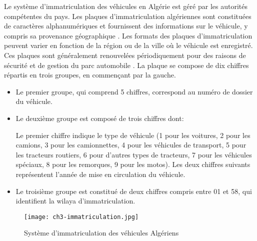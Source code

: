 Le système d'immatriculation des véhicules en Algérie est géré par les autorités compétentes du pays. 
Les plaques d'immatriculation algériennes sont constituées de caractères alphanumériques et fournissent des informations sur le véhicule, y compris sa provenance géographique \cite{wikipedia-plaque-immatriculation}. 
Les formats des plaques d'immatriculation peuvent varier en fonction de la région ou de la ville où le véhicule est enregistré. Ces plaques sont généralement renouvelées périodiquement pour des raisons de sécurité et de gestion du parc automobile \cite{akacem2015reconnaissance}.
La plaque se compose de dix chiffres répartis en trois groupes, en commençant par la gauche. 
\begin{itemize}
    \item Le premier groupe, qui comprend 5 chiffres, correspond au numéro de dossier du véhicule.
\item Le deuxième groupe est composé de trois chiffres dont:
\begin{outline}
    
\1 Le premier chiffre indique le type de véhicule (1 pour les voitures, 2 pour les camions, 3 pour les camionnettes, 4 pour les véhicules de transport, 5 pour les tracteurs routiers, 6 pour d'autres types de tracteurs, 7 pour les véhicules spéciaux, 8 pour les remorques, 9 pour les motos). 
\1 Les deux chiffres suivants représentent l'année de mise en circulation du véhicule.
\end{outline}
\item Le troisième groupe est constitué de deux chiffres compris entre 01 et 58, qui identifient la wilaya d'immatriculation.
\end{itemize}
\begin{figure}[H]
	\centering
	\texttt{[image: ch3-immatriculation.jpg]}
	\caption{ Système d’immatriculation des véhicules Algériens}
\end{figure}




